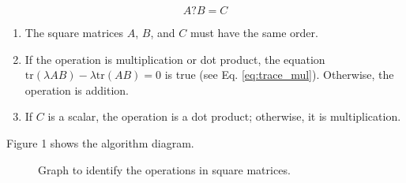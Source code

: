 \documentclass{article}
\begin{document}
	\begin{equation}
		A ? B = C
		\label{eq:operation}
	\end{equation}
		
	\begin{enumerate}
		\item The square matrices \(A\), \(B\), and \(C\) must have the same order.
		\item If the operation is multiplication or dot product, the equation \(\text{tr}(\lambda AB) - \lambda \text{tr}(AB) = 0\) is true (see Eq. \eqref{eq:trace_mul}). Otherwise, the operation is addition.
		\item If \(C\) is a scalar, the operation is a dot product; otherwise, it is multiplication.
	\end{enumerate}
	
	Figure 1 shows the algorithm diagram.
	
	\begin{figure}[h!]
		\centering
		\caption{Graph to identify the operations in square matrices.}
	\end{figure}
	

	
\end{document}
